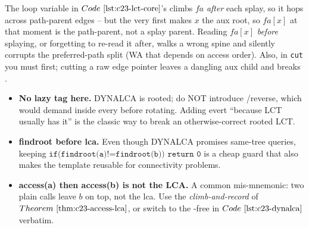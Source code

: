 \begin{warningbox}
The loop variable in \(\coderef{c23-lct-core}\)'s  climbs
\(\mathit{fa}\) \emph{after} each splay, so it hops across path-parent edges -- but
the very first  makes \(x\) the aux root, so \(\mathit{fa}[x]\) at
that moment is the path-parent, not a splay parent. Reading \(\mathit{fa}[x]\)
\emph{before} splaying, or forgetting to re-read it after, walks a wrong spine and
silently corrupts the preferred-path split (WA that depends on access order). Also,
in \texttt{cut} you must  first; cutting a raw edge pointer leaves a
dangling aux child and breaks .
\end{warningbox}

\begin{hardeningbox}
\begin{itemize}[nosep,leftmargin=1.4em]
  \item \textbf{No lazy tag here.} DYNALCA is rooted; do NOT introduce
        /reverse, which would demand  inside every
         before rotating. Adding evert ``because LCT usually has it'' is
        the classic way to break an otherwise-correct rooted LCT.
  \item \textbf{findroot before lca.} Even though DYNALCA promises same-tree
        queries, keeping \(\texttt{if(findroot(a)!=findroot(b)) return 0}\) is a cheap
        guard that also makes the template reusable for connectivity problems.
  \item \textbf{access(a) then access(b) is not the LCA.} A common mis-mnemonic:
        two plain  calls leave \(b\) on top, not the lca. Use the
        \emph{climb-and-record} of \(\thmref{c23-access-lca}\), or switch to the
        -free  in \(\coderef{c23-dynalca}\) verbatim.
\end{itemize}
\end{hardeningbox}

